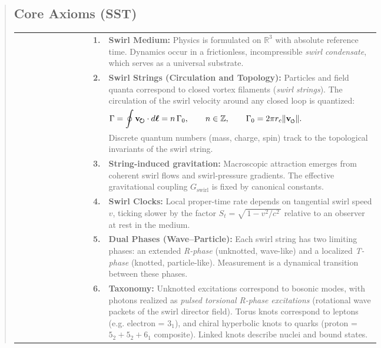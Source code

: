 \documentclass[10pt,reprint,aps,onecolumn,nofootinbib]{revtex4-2}
\newcommand{\vnorm}{\lVert \mathbf{v}_{\mkern-2mu\scriptscriptstyle\boldsymbol{\circlearrowleft}} \rVert}               %
\begin{document}
\begin{abstract}
        \subsection*{Core Axioms (SST)}
            \begin{tabular}{r@{\quad}p{0.75\linewidth}}
                \textbf{1.} & \textbf{Swirl Medium:} Physics is formulated on $\mathbb{R}^3$ with absolute reference time. Dynamics occur in a frictionless, incompressible \emph{swirl condensate}, which serves as a universal substrate. \\
                \textbf{2.} & \textbf{Swirl Strings (Circulation and Topology):} Particles and field quanta correspond to closed vortex filaments (\emph{swirl strings}). The circulation of the swirl velocity around any closed loop is quantized: \\
                & $\displaystyle \Gamma = \oint \mathbf{v}_{\mkern-2mu\scriptstyle\boldsymbol{\circlearrowright}} \cdot d\boldsymbol{\ell} = n\,\Gamma_0,\qquad n\in\mathbb{Z},\qquad \Gamma_0 = 2\pi r_c \vnorm.$ \\
                & Discrete quantum numbers (mass, charge, spin) track to the topological invariants of the swirl string. \\
                \textbf{3.} & \textbf{String-induced gravitation:} Macroscopic attraction emerges from coherent swirl flows and swirl-pressure gradients. The effective gravitational coupling $G_{\text{swirl}}$ is fixed by canonical constants. \\
                \textbf{4.} & \textbf{Swirl Clocks:} Local proper-time rate depends on tangential swirl speed $v$, ticking slower by the factor $S_t=\sqrt{\,1-v^2/c^2\,}$ relative to an observer at rest in the medium. \\
                \textbf{5.} & \textbf{Dual Phases (Wave–Particle):} Each swirl string has two limiting phases: an extended \emph{R-phase} (unknotted, wave-like) and a localized \emph{T-phase} (knotted, particle-like). Measurement is a dynamical transition between these phases. \\
                \textbf{6.} & \textbf{Taxonomy:} Unknotted excitations correspond to bosonic modes,
                with photons realized as \emph{pulsed torsional R-phase excitations} (rotational wave packets of the swirl director field). Torus knots correspond to leptons (e.g. electron = $3_1$), and chiral hyperbolic knots to quarks (proton = $5_2+5_2+6_1$ composite). Linked knots describe nuclei and bound states. \\

            \end{tabular}
    \end{abstract}
    \maketitle
\end{document}
